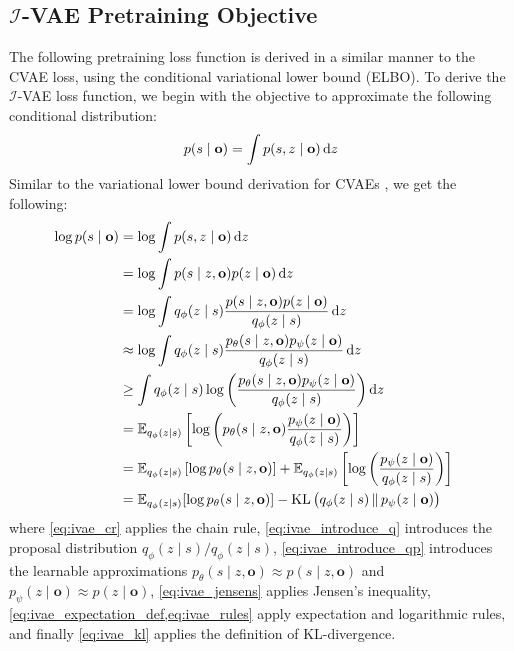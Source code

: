 \subsection{$\mathcal{I}$-VAE Pretraining Objective}

The following pretraining loss function is derived in a similar manner to the CVAE loss, using the conditional variational lower bound (ELBO).
To derive the $\mathcal{I}$-VAE loss function, we begin with the objective to approximate the following conditional distribution:
\begin{equation}
    p(s \mid \mathbf{o}) = \int p(s, z \mid \mathbf{o}) \mathop{}\!\mathrm{d} z \label{eq:ivae_objective}
\end{equation}
Similar to the variational lower bound derivation for CVAEs \cite{sohn2015learning}, we get the following:
\begin{align}
    \log p(s \mid \mathbf{o}) &= \log \int p(s, z \mid \mathbf{o}) \mathop{}\!\mathrm{d} z && \\
    &= \log \int p(s \mid z, \mathbf{o}) p(z \mid \mathbf{o}) \mathop{}\!\mathrm{d} z \label{eq:ivae_cr} \\
    &= \log \int q_\phi(z \mid s) \frac{p(s \mid z, \mathbf{o})p(z \mid \mathbf{o})}{q_\phi(z \mid s)} \mathop{}\!\mathrm{d} z \label{eq:ivae_introduce_q} \\
    &\approx \log \int q_\phi(z \mid s) \frac{p_\theta(s \mid z, \mathbf{o})p_\psi(z \mid \mathbf{o})}{q_\phi(z \mid s)} \mathop{}\!\mathrm{d} z \label{eq:ivae_introduce_qp} \\
    &\ge \int q_\phi(z \mid s) \log\left( \frac{p_\theta(s \mid z, \mathbf{o})p_\psi(z \mid \mathbf{o})}{q_\phi(z \mid s)} \right) \mathop{}\!\mathrm{d} z \label{eq:ivae_jensens} \\
    &= \mathbb{E}_{q_\phi(z \mid s)} \left[ \log\left( p_\theta(s \mid z, \mathbf{o}) \frac{p_\psi(z \mid \mathbf{o})}{q_\phi(z \mid s)} \right) \right] \label{eq:ivae_expectation_def} \\
    &= \mathbb{E}_{q_\phi(z \mid s)} \left[ \log p_\theta(s \mid z, \mathbf{o}) \right] + \mathbb{E}_{q_\phi(z \mid s)} \left[ \log\left( \frac{p_\psi(z \mid \mathbf{o})}{q_\phi(z \mid s)} \right) \right] \label{eq:ivae_rules} \\
    &= \mathbb{E}_{q_\phi(z \mid s)}[\log p_\theta(s \mid z, \mathbf{o})] - \operatorname{KL}\big(q_\phi(z \mid s) \,\Vert\, p_\psi(z \mid \mathbf{o})\big) \label{eq:ivae_kl}
\end{align}
where \cref{eq:ivae_cr} applies the chain rule,
\cref{eq:ivae_introduce_q} introduces the proposal distribution $q_\phi(z \mid s) / q_\phi(z \mid s)$, \cref{eq:ivae_introduce_qp} introduces the learnable approximations $p_\theta(s \mid z, \mathbf{o}) \approx p(s \mid z, \mathbf{o})$ and $p_\psi(z \mid \mathbf{o}) \approx p(z \mid \mathbf{o})$, \cref{eq:ivae_jensens} applies Jensen's inequality, \cref{eq:ivae_expectation_def,eq:ivae_rules} apply expectation and logarithmic rules, and finally \cref{eq:ivae_kl} applies the definition of KL-divergence.


